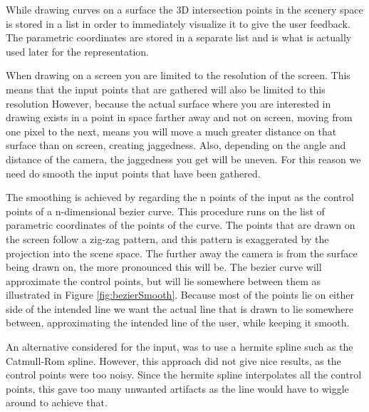 \documentclass[a4paper,12pt]{report}
\begin{document}
While drawing curves on a surface the 3D intersection points in the scenery space is stored in a list in order to immediately visualize it to give the user feedback. The parametric coordinates are stored in a separate list and is what is actually used later for the representation.

When drawing on a screen you are limited to the resolution of the screen. This means that the input points that are gathered will also be limited to this resolution However, because the actual surface where you are interested in drawing exists in a point in space farther away and not on screen, moving from one pixel to the next, means you will move a much greater distance on that surface than on screen, creating jaggedness. Also, depending on the angle and distance of the camera, the jaggedness you get will be uneven. For this reason we need do smooth the input points that have been gathered. 

The smoothing is achieved by regarding the n points of the  input as the control points of a n-dimensional bezier curve. This procedure runs on the list of parametric coordinates of the points of the curve. The points that are drawn on the screen follow a zig-zag pattern, and this pattern is exaggerated by the projection into the scene space. The further away the camera is from the surface being drawn on, the more pronounced this will be. The bezier curve will approximate the control points, but will lie somewhere between them as illustrated in Figure \ref{fig:bezierSmooth}. Because most of the points lie on either side of the intended line we want the actual line that is drawn to lie somewhere between, approximating the intended line of the user, while keeping it smooth.

An alternative considered for the input, was to use a hermite spline such as the Catmull-Rom spline. However, this approach did not give nice results, as the control points were too noisy. Since the hermite spline interpolates all the control points, this gave too many unwanted artifacts as the line would have to wiggle around to achieve that.
\end{document}
